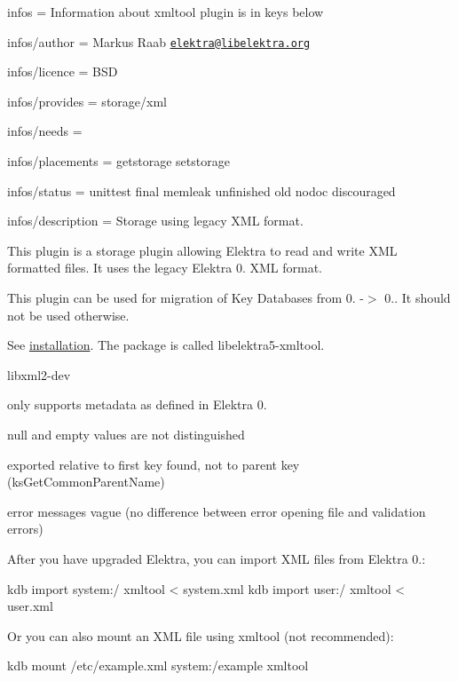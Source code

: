 
\begin{DoxyItemize}
\item infos = Information about xmltool plugin is in keys below
\item infos/author = Markus Raab \href{mailto:elektra@libelektra.org}{\tt elektra@libelektra.\+org}
\item infos/licence = B\+SD
\item infos/provides = storage/xml
\item infos/needs =
\item infos/placements = getstorage setstorage
\item infos/status = unittest final memleak unfinished old nodoc discouraged
\item infos/description = Storage using legacy X\+ML format.
\end{DoxyItemize}

This plugin is a storage plugin allowing Elektra to read and write X\+ML formatted files. It uses the legacy Elektra 0. X\+ML format.

This plugin can be used for migration of Key Databases from 0. -\/$>$ 0.. It should not be used otherwise.

See \hyperlink{doc_INSTALL_md}{installation}. The package is called {\ttfamily libelektra5-\/xmltool}.


\begin{DoxyItemize}
\item {\ttfamily libxml2-\/dev}
\end{DoxyItemize}


\begin{DoxyItemize}
\item only supports metadata as defined in Elektra 0.
\item null and empty values are not distinguished
\item exported relative to first key found, not to parent key (ks\+Get\+Common\+Parent\+Name)
\item error messages vague (no difference between error opening file and validation errors)
\end{DoxyItemize}

After you have upgraded Elektra, you can import X\+ML files from Elektra 0.\+:


\begin{DoxyCode}
kdb import system:/ xmltool < system.xml
kdb import user:/ xmltool < user.xml
\end{DoxyCode}


Or you can also mount an X\+ML file using {\ttfamily xmltool} (not recommended)\+:


\begin{DoxyCode}
kdb mount /etc/example.xml system:/example xmltool
\end{DoxyCode}
 